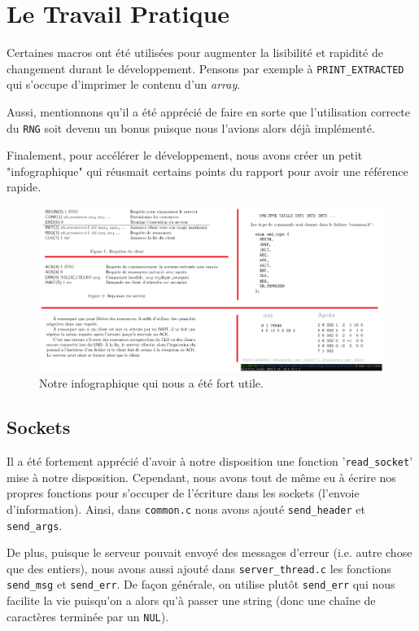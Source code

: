 \documentclass[11pt]{article}
\begin{document}
\section{Le Travail Pratique}

Certaines macros ont été utilisées pour augmenter la lisibilité et rapidité de changement durant le développement. Pensons par exemple à \texttt{PRINT\_EXTRACTED} qui s'occupe d'imprimer le contenu d'un \textit{array}.

Aussi, mentionnons qu'il a été apprécié de faire en sorte que l'utilisation correcte du \texttt{RNG} soit devenu un bonus puisque nous l'avions alors déjà implémenté.

Finalement, pour accélérer le développement, nous avons créer un petit "infographique" qui réusmait certains points du rapport pour avoir une référence rapide.

\begin{figure}
    \includegraphics[width=\linewidth]{infographic.png}
    \caption{Notre infographique qui nous a été fort utile.}
    \label{fig:infog}
\end{figure}

\subsection{Sockets}

Il a été fortement apprécié d'avoir à notre disposition une fonction '\texttt{read\_socket}' mise à notre disposition. Cependant, nous avons tout de même eu à écrire nos propres fonctions pour s'occuper de l'écriture dans les sockets (l'envoie d'information). Ainsi, dans \texttt{common.c} nous avons ajouté \texttt{send\_header} et \texttt{send\_args}.

De plus, puisque le serveur pouvait envoyé des messages d'erreur (i.e. autre chose que des entiers), nous avons aussi ajouté dans \texttt{server\_thread.c} les fonctions \texttt{send\_msg} et \texttt{send\_err}. De façon générale, on utilise plutôt \texttt{send\_err} qui nous facilite la vie puisqu'on a alors qu'à passer une string (donc une chaîne de caractères terminée par un \texttt{NUL}).
\end{document}

